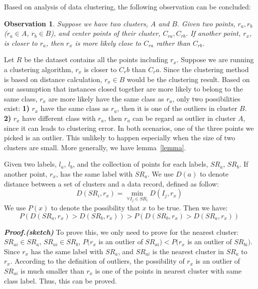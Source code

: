 \documentclass[runningheads]{llncs}
\newtheorem{observation}{Observation}
\begin{document}
	Based on analysis of data clustering, the following observation can be concluded:
	
	\begin{observation} \label{observation}
		Suppose we have two clusters, $A$ and $B$. Given two points, $r_a, r_b$ ($r_a \in A$, $r_b \in B$), and center points of their cluster, $C_{ra}, C_{rb}$. If another point, $r_x$, is closer to $r_a$, then $r_x$ is more likely close to $C_{ra}$ rather than $C_{rb}$.
	\end{observation}
	
	Let $R$ be the dataset contains all the points including $r_x$. Suppose we are running a clustering algorithm, $r_x$ is closer to $C_rb$ than $C_ra$. Since the clustering method is based on distance calculation, $r_x \in B$ would be the clustering result. Based on our assumption that instances closed together are more likely to belong to the same class, $r_x$ are more likely have the same class as $r_a$, only two possibilities exist: \textbf{1)} $r_x$ have the same class as $r_a$, then it is one of the outliers in cluster $B$. \textbf{2)} $r_x$ have different class with $r_a$, then $r_a$ can be regard as outlier in cluster $A$, since it can leads to clustering error. In both scenarios, one of the three points we picked is an outlier. This unlikely to happen especially when the size of two clusters are small. More generally, we have lemma~\ref{lemma}.
	
	\begin{lemma} \label{lemma}
		Given two labels, $l_a$, $l_b$, and the collection of points for each labels, $SR_a$, $SR_b$. If another point, $r_x$, has the same label with $SR_a$. We use $D(a)$ to denote distance between a set of clusters and a data record, defined as follow:
		\begin{displaymath}
		D(SR_i, r_x) = \min_{\forall I_j \in SR_i} D(I_j, r_x) 
		\end{displaymath}
		We use $P(x)$ to denote the possibility that $x$ to be true. Then we have:
		\begin{displaymath}
		P(D(SR_a, r_x) > D(SR_b, r_x)) > P(D(SR_b, r_x) > D(SR_a, r_x))
		\end{displaymath}
	\end{lemma}
	
	\textbf{\textit{Proof.(sketch)}} 
	To prove this, we only need to prove for the nearest cluster: $SR_{ai} \in SR_a$, $SR_{ai} \in SR_b$, $P(r_x$ is an outlier of $SR_{ai}) < P(r_x$ is an outlier of $SR_{bi})$. Since $r_x$ has the same label with $SR_a$, and $SR_{ai}$ is the nearest cluster in $SR_a$ to $r_x$. According to the definition of outliers, the possibility of $r_x$ is an outlier of $SR_{ai}$ is much smaller than $r_x$ is one of the points in nearest cluster with same class label. Thus, this can be proved.
	
\end{document}
